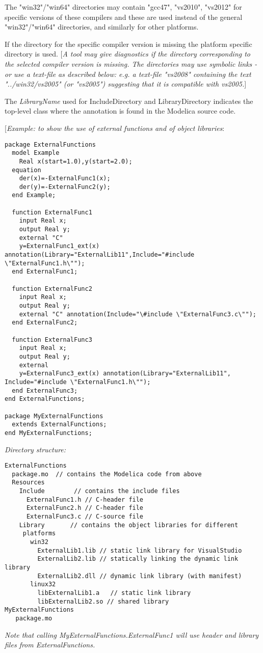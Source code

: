 The "win32"/"win64" directories may contain "gcc47", "vs2010", "vs2012"
for specific versions of these compilers and these are used instead of
the general "win32"/"win64" directories, and similarly for other
platforms.

If the directory for the specific compiler version is missing the
platform specific directory is used. {[}\emph{A tool may give
diagnostics if the directory corresponding to the selected compiler
version is missing. The directories may use symbolic links - or use a
text-file as described below: e.g. a text-file "vs2008" containing the
text "../win32/vs2005" (or "vs2005") suggesting that it is compatible
with vs2005.}{]}

The \emph{LibraryName} used for IncludeDirectory and LibraryDirectory
indicates the top-level class where the annotation is found in the
Modelica source code.

{[}\emph{Example: to show the use of external functions and of object
libraries}:

\begin{lstlisting}[language=modelica]
package ExternalFunctions
  model Example
    Real x(start=1.0),y(start=2.0);
  equation
    der(x)=-ExternalFunc1(x);
    der(y)=-ExternalFunc2(y);
  end Example;

  function ExternalFunc1
    input Real x;
    output Real y;
    external "C"
    y=ExternalFunc1_ext(x) annotation(Library="ExternalLib11",Include="#include \"ExternalFunc1.h\"");
  end ExternalFunc1;

  function ExternalFunc2
    input Real x;
    output Real y;
    external "C" annotation(Include="\#include \"ExternalFunc3.c\"");
  end ExternalFunc2;

  function ExternalFunc3
    input Real x;
    output Real y;
    external
    y=ExternalFunc3_ext(x) annotation(Library="ExternalLib11", Include="#include \"ExternalFunc1.h\"");
  end ExternalFunc3;
end ExternalFunctions;

package MyExternalFunctions
  extends ExternalFunctions;
end MyExternalFunctions;
\end{lstlisting}
\emph{Directory structure:}

\textbf{}

\begin{lstlisting}[language=modelica]
ExternalFunctions
  package.mo  // contains the Modelica code from above
  Resources
    Include        // contains the include files
      ExternalFunc1.h // C-header file
      ExternalFunc2.h // C-header file
      ExternalFunc3.c // C-source file
    Library       // contains the object libraries for different
     platforms
       win32
         ExternalLib1.lib // static link library for VisualStudio
         ExternalLib2.lib // statically linking the dynamic link library
         ExternalLib2.dll // dynamic link library (with manifest)
       linux32
         libExternalLib1.a   // static link library
         libExternalLib2.so // shared library
MyExternalFunctions
   package.mo
\end{lstlisting}
\emph{Note that calling MyExternalFunctions.ExternalFunc1 will use
header and library files from ExternalFunctions.}

